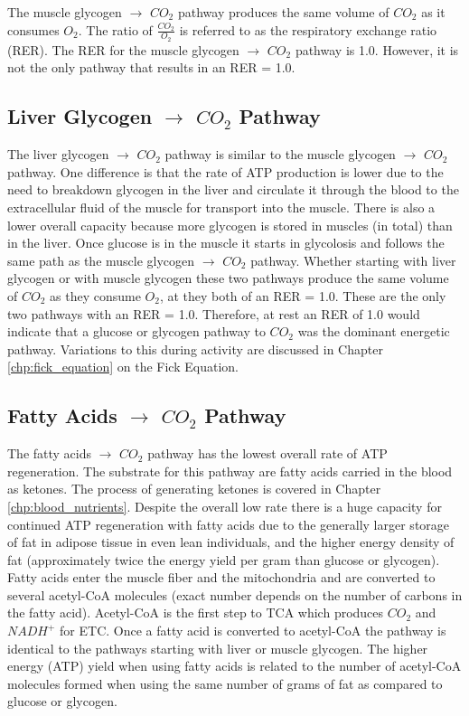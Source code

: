 The muscle glycogen $\rightarrow$ $CO_2$ pathway produces the same volume of $CO_2$ as it consumes $O_2$. The ratio of $\frac{CO_2}{O_2}$ is referred to as the respiratory exchange ratio (RER). The RER for the muscle glycogen $\rightarrow$ $CO_2$ pathway is 1.0. However, it is not the only pathway that results in an RER = 1.0. 


\subsection{Liver Glycogen $\rightarrow$ $CO_2$ Pathway}

The liver glycogen $\rightarrow$ $CO_2$ pathway is similar to the muscle glycogen $\rightarrow$ $CO_2$ pathway. One difference is that the rate of ATP production is lower due to the need to breakdown glycogen in the liver and circulate it through the blood to the extracellular fluid of the muscle for transport into the muscle. There is also a lower overall capacity because more glycogen is stored in muscles (in total) than in the liver. Once glucose is in the muscle it starts in glycolosis and follows the same path as the muscle glycogen $\rightarrow$ $CO_2$ pathway. Whether starting with liver glycogen or with muscle glycogen these two pathways produce the same volume of $CO_2$ as they consume $O_2$, at they both of an RER = 1.0. These are the only two pathways with an RER = 1.0. Therefore, at rest an RER of 1.0 would indicate that a glucose or glycogen pathway to $CO_2$ was the dominant energetic pathway. Variations to this during activity are discussed in Chapter \ref{chp:fick_equation} on the Fick Equation.

\subsection{Fatty Acids $\rightarrow$ $CO_2$ Pathway}

The fatty acids $\rightarrow$ $CO_2$ pathway has the lowest overall rate of ATP regeneration. The substrate for this pathway are fatty acids carried in the blood as ketones. The process of generating ketones is covered in Chapter \ref{chp:blood_nutrients}. Despite the overall low rate there is a huge capacity for continued ATP regeneration with fatty acids due to the generally larger storage of fat in adipose tissue in even lean individuals, and the higher energy density of fat (approximately twice the energy yield per gram than glucose or glycogen). Fatty acids enter the muscle fiber and the mitochondria and are converted to several acetyl-CoA molecules (exact number depends on the number of carbons in the fatty acid). Acetyl-CoA is the first step to TCA which produces $CO_2$ and $NADH^+$ for ETC. Once a fatty acid is converted to acetyl-CoA the pathway is identical to the pathways starting with liver or muscle glycogen. The higher energy (ATP) yield when using fatty acids is related to the number of acetyl-CoA molecules formed when using the same number of grams of fat as compared to glucose or glycogen. 


